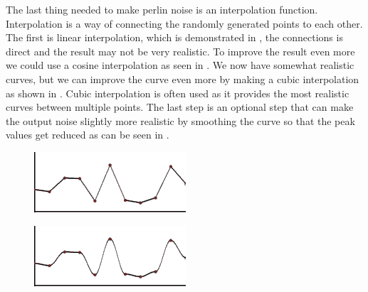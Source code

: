 The last thing needed to make perlin noise is an interpolation function. Interpolation is a way of connecting the randomly generated points to each other. The first is linear interpolation, which is demonstrated in , the connections is direct and the result may not be very realistic. To improve the result even more we could use a cosine interpolation as seen in . We now have somewhat realistic curves, but we can improve the curve even more by making a cubic interpolation as shown in . Cubic interpolation is often used as it provides the most realistic curves between multiple points. The last step is an optional step that can make the output noise slightly more realistic by smoothing the curve so that the peak values get reduced as can be seen in .


\begin{figure}[H]
	\begin{minipage}[b]{.5\linewidth}
		\includegraphics[width=0.95\linewidth]{img/m_inter1}
		\label{fig:1a}
	\end{minipage}
	\begin{minipage}[b]{.5\linewidth}
		\includegraphics[width=0.95\linewidth]{img/m_inter2}
		\label{fig:1b}

\end{minipage}
\end{figure}
